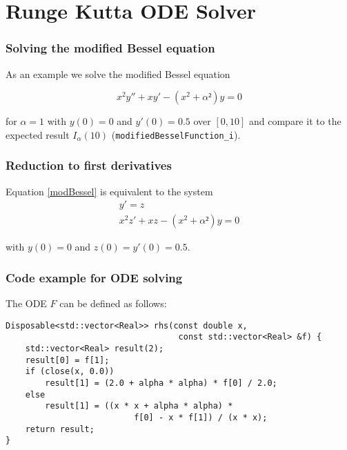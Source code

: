 \documentclass{beamer}
\begin{document}
\section{Runge Kutta ODE Solver}


\begin{frame}[fragile]
\frametitle{Solving the modified Bessel equation}
As an example we solve the modified Bessel equation

\begin{equation}\label{modBessel}
x^2y''+xy'-(x^2+\alpha²)y = 0
\end{equation}

for $\alpha=1$ with $y(0)=0$ and $y'(0)=0.5$ over $[0,10]$ and compare it to the expected result $I_\alpha(10)$ (\verb+modifiedBesselFunction_i+).
\end{frame}

\begin{frame}[fragile]
\frametitle{Reduction to first derivatives}
Equation \ref{modBessel} is equivalent to the system
\begin{eqnarray}
y' = z \\
x^2z'+xz-(x^2+\alpha²)y = 0
\end{eqnarray}

with $y(0)=0$ and $z(0)=y'(0)=0.5$.
\end{frame}

\begin{frame}[fragile]
\frametitle{Code example for ODE solving}
The ODE $F$ can be defined as follows:
\vspace{2mm}
\begin{verbatim}
Disposable<std::vector<Real>> rhs(const double x, 
                                   const std::vector<Real> &f) {
    std::vector<Real> result(2);
    result[0] = f[1];
    if (close(x, 0.0))
        result[1] = (2.0 + alpha * alpha) * f[0] / 2.0;
    else
        result[1] = ((x * x + alpha * alpha) *
                          f[0] - x * f[1]) / (x * x);
    return result;
}
\end{verbatim}

\end{frame}
\end{document}
